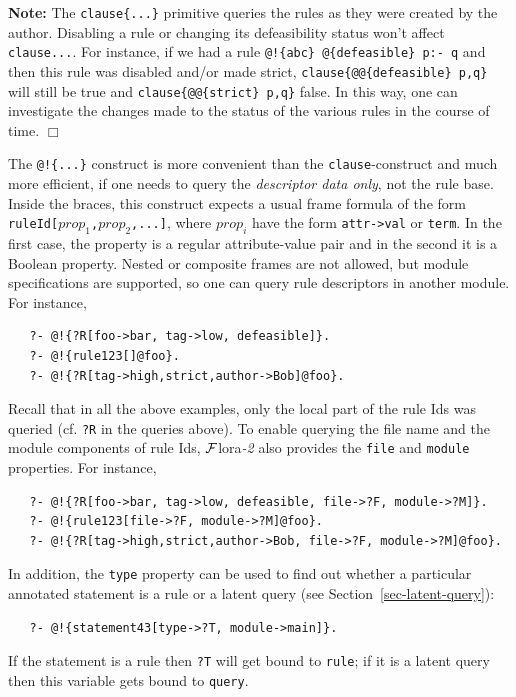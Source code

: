 \documentclass[11pt]{article}
\newcommand{\FLORA}{{\mbox{\sc ${\cal F}${lora}\rm\emph{-2}}}\xspace}
\newcommand{\FLSYSTEM}{\FLORA}
\begin{document}
\noindent
\textbf{Note:} The \texttt{clause\{...\}} primitive queries the rules as
they were created by the author. Disabling a rule or changing its
defeasibility status won't affect \texttt{clause{...}}.
For instance, if we had a
rule \texttt{@!\{abc\} @\{defeasible\} p:- q}
and then this rule was disabled and/or
made strict, \texttt{clause\{@@\{defeasible\} p,q\}}
will still be true and
\texttt{clause\{@@\{strict\} p,q\}} 
false. In this way, one can investigate the changes
made to the status of the various rules in the course of time.   
\hfill $\Box$

The \texttt{@!\{...\}} construct is more convenient than the
\texttt{clause}-construct and much more efficient,
if one needs to query the \emph{descriptor data
  only}, not the rule base. Inside the braces, this construct expects a
usual frame formula of the form \texttt{ruleId[$prop_1$,$prop_2$,...]}, where
$prop_i$ have the form \texttt{attr->val} or \texttt{term}. In the first
case, the property is a regular attribute-value pair and in the second it
is a Boolean property. Nested or composite frames are not allowed, but
module specifications are supported, so one can query rule descriptors in
another module. For instance,
\begin{verbatim}
   ?- @!{?R[foo->bar, tag->low, defeasible]}.
   ?- @!{rule123[]@foo}.
   ?- @!{?R[tag->high,strict,author->Bob]@foo}.
\end{verbatim}
Recall that in all the above examples, only the local part of the rule Ids was
queried (cf. \texttt{?R} in the queries above). To enable querying the file
name and the module components of rule Ids, \FLSYSTEM also provides the
\texttt{file} and \texttt{module} properties. For instance,
\begin{verbatim}
   ?- @!{?R[foo->bar, tag->low, defeasible, file->?F, module->?M]}.
   ?- @!{rule123[file->?F, module->?M]@foo}.
   ?- @!{?R[tag->high,strict,author->Bob, file->?F, module->?M]@foo}.
\end{verbatim}
In addition, the \texttt{type}  property can be used to find out whether a particular
annotated statement is a rule or a latent query (see
Section~\ref{sec-latent-query}):
\begin{verbatim}
   ?- @!{statement43[type->?T, module->main]}.
\end{verbatim}
If the statement is a rule then \texttt{?T} will get bound to
\texttt{rule}; if it is a latent query then this variable gets
bound to \texttt{query}. 
\end{document}
